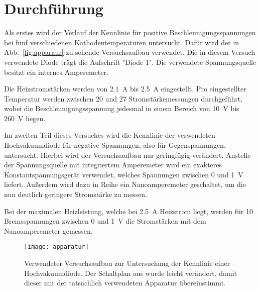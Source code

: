 
\section{Durchführung}
%
Als erstes wird der Verlauf der Kennlinie für positive Beschleunigungsspannungen bei fünf verschiedenen Kathodentemperaturen untersucht. Dafür wird der in Abb.~\ref{fig:apparaur} zu sehende Versuchsaufbau verwendet. Die in diesem Versuch verwendete Diode trägt die Aufschrift "Diode 1". Die verwendete Spannungsquelle besitzt ein internes Amperemeter.

Die Heizstromstärken werden von \SI{2.1}{\ampere} bis \SI{2.5}{\ampere} eingestellt. Pro eingestellter Temperatur werden zwischen 20 und 27 Stromstärkemessungen durchgeführt, wobei die Beschleunigungsspannung jedesmal in einem Bereich von \SI{10}{\volt} bis \SI{260}{\volt} liegen.

Im zweiten Teil dieses Versuches wird die Kennlinie der verwendeten Hochvakuumdiode für negative Spannungen, also für Gegenspannungen, untersucht.
Hierbei wird der Versuchsaufbau nur geringfügig verändert. Anstelle der Spannungsquelle mit integriertem Amperemeter wird ein exakteres Konstantspannungsgerät verwendet, welches Spannungen zwischen 0 und \SI{1}{\volt} liefert. Außerdem wird dazu in Reihe ein Nanoamperemeter geschaltet, um die nun deutlich geringere Stromstärke zu messen.

Bei der maximalen Heizleistung, welche bei \SI{2.5}{\ampere} Heizstrom liegt, werden für 10 Bremsspannungen zwischen 0 und \SI{1}{\volt} die Stromstärken mit dem Nanoamperemeter gemessen.
\begin{figure}
\centering
\texttt{[image: apparatur]}
\caption{Verwendeter Versuchsaufbau zur Untersuchung der Kennlinie einer Hochvakuumdiode. Der Schaltplan aus \textcite{v504} wurde leicht verändert, damit dieser mit der tatsächlich verwendeten Apparatur übereinstimmt.}
\label{fig:apparatur}
\end{figure}
%